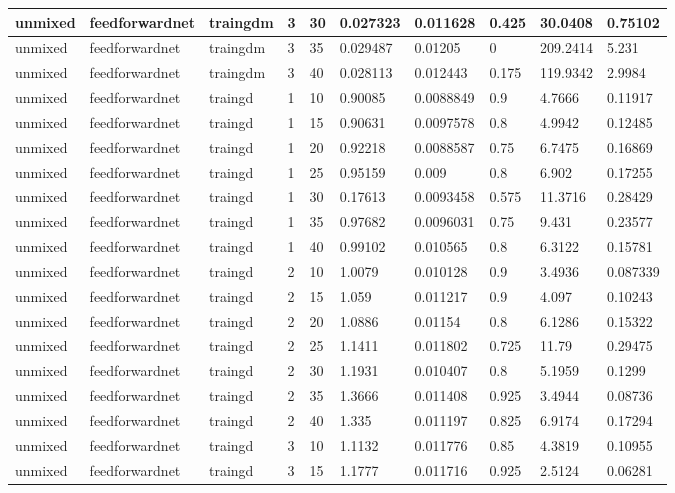 \begin{longtable}{lllllllll}
unmixed & feedforwardnet & traingdm & 3 & 30 & 0.027323 & 0.011628 & 0.425 & 30.0408 & 0.75102 \\ \hline 
unmixed & feedforwardnet & traingdm & 3 & 35 & 0.029487 & 0.01205 & 0 & 209.2414 & 5.231 \\ \hline 
unmixed & feedforwardnet & traingdm & 3 & 40 & 0.028113 & 0.012443 & 0.175 & 119.9342 & 2.9984 \\ \hline 
unmixed & feedforwardnet & traingd & 1 & 10 & 0.90085 & 0.0088849 & 0.9 & 4.7666 & 0.11917 \\ \hline 
unmixed & feedforwardnet & traingd & 1 & 15 & 0.90631 & 0.0097578 & 0.8 & 4.9942 & 0.12485 \\ \hline 
unmixed & feedforwardnet & traingd & 1 & 20 & 0.92218 & 0.0088587 & 0.75 & 6.7475 & 0.16869 \\ \hline 
unmixed & feedforwardnet & traingd & 1 & 25 & 0.95159 & 0.009 & 0.8 & 6.902 & 0.17255 \\ \hline 
unmixed & feedforwardnet & traingd & 1 & 30 & 0.17613 & 0.0093458 & 0.575 & 11.3716 & 0.28429 \\ \hline 
unmixed & feedforwardnet & traingd & 1 & 35 & 0.97682 & 0.0096031 & 0.75 & 9.431 & 0.23577 \\ \hline 
unmixed & feedforwardnet & traingd & 1 & 40 & 0.99102 & 0.010565 & 0.8 & 6.3122 & 0.15781 \\ \hline 
unmixed & feedforwardnet & traingd & 2 & 10 & 1.0079 & 0.010128 & 0.9 & 3.4936 & 0.087339 \\ \hline 
unmixed & feedforwardnet & traingd & 2 & 15 & 1.059 & 0.011217 & 0.9 & 4.097 & 0.10243 \\ \hline 
unmixed & feedforwardnet & traingd & 2 & 20 & 1.0886 & 0.01154 & 0.8 & 6.1286 & 0.15322 \\ \hline 
unmixed & feedforwardnet & traingd & 2 & 25 & 1.1411 & 0.011802 & 0.725 & 11.79 & 0.29475 \\ \hline 
unmixed & feedforwardnet & traingd & 2 & 30 & 1.1931 & 0.010407 & 0.8 & 5.1959 & 0.1299 \\ \hline 
unmixed & feedforwardnet & traingd & 2 & 35 & 1.3666 & 0.011408 & 0.925 & 3.4944 & 0.08736 \\ \hline 
unmixed & feedforwardnet & traingd & 2 & 40 & 1.335 & 0.011197 & 0.825 & 6.9174 & 0.17294 \\ \hline 
unmixed & feedforwardnet & traingd & 3 & 10 & 1.1132 & 0.011776 & 0.85 & 4.3819 & 0.10955 \\ \hline 
unmixed & feedforwardnet & traingd & 3 & 15 & 1.1777 & 0.011716 & 0.925 & 2.5124 & 0.06281 \\ \hline 

\end{longtable}
